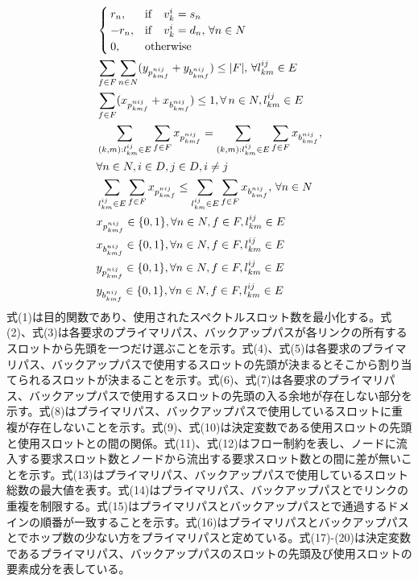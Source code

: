 \documentclass[a4j,twocolumn,fleqn]{jarticle}
\begin{document}
\begin{eqnarray}
	&\begin{cases}
	r_n,&{\rm if}\quad v^i_k = s_n\\
	-r_n,&{\rm if}\quad v^i_k = d_n,\, \forall n\in N\\ %
	0,&{\rm otherwise}
	\end{cases}\\
	&\displaystyle \sum_{f \in F}\sum_{n \in N}(y_{p^{nij}_{kmf}} + y_{b^{nij}_{kmf}}) \leq |F|,\, \forall l^{ij}_{km} \in E \\%
	&\displaystyle \sum_{f \in F}(x_{p^{nij}_{kmf}}+x_{b^{nij}_{kmf}}) \leq 1,\forall\, n \in N,l^{ij}_{km} \in E\\%
	&\displaystyle \sum_{(k,m):l^{ij}_{km} \in E}\sum_{f \in F}x_{p^{nij}_{kmf}} =\sum_{(k,m):l^{ij}_{km} \in E}\sum_{f \in F}x_{b^{nij}_{kmf}},\nonumber\\
	&\displaystyle \forall n \in N,i \in D,j \in D,i \neq j\\%
	&\displaystyle \sum_{l^{ij}_{km} \in E}\sum_{f \in F}x_{p^{nij}_{kmf}} \leq \sum_{l^{ij}_{km} \in E}\sum_{f \in F}x_{b^{nij}_{kmf}},\, \forall n\in N\\%
	&\displaystyle x_{p^{nij}_{kmf}} \in \{0,1\},\forall n \in N,f \in F,l^{ij}_{km}\in E\\
	&\displaystyle x_{b^{nij}_{kmf}} \in \{0,1\},\forall n \in N,f \in F,l^{ij}_{km}\in E\\
	&\displaystyle y_{p^{nij}_{kmf}} \in \{0,1\},\forall n \in N,f \in F,l^{ij}_{km}\in E\\
	&\displaystyle y_{b^{nij}_{kmf}} \in \{0,1\},\forall n \in N,f \in F,l^{ij}_{km}\in E
\end{eqnarray}
式(1)は目的関数であり、使用されたスペクトルスロット数を最小化する。式(2)、式(3)は各要求のプライマリパス、バックアップパスが各リンクの所有するスロットから先頭を一つだけ選ぶことを示す。式(4)、式(5)は各要求のプライマリパス、バックアップパスで使用するスロットの先頭が決まるとそこから割り当てられるスロットが決まることを示す。式(6)、式(7)は各要求のプライマリパス、バックアップパスで使用するスロットの先頭の入る余地が存在しない部分を示す。式(8)はプライマリパス、バックアップパスで使用しているスロットに重複が存在しないことを示す。式(9)、式(10)は決定変数である使用スロットの先頭と使用スロットとの間の関係。式(11)、式(12)はフロー制約を表し、ノードに流入する要求スロット数とノードから流出する要求スロット数との間に差が無いことを示す。式(13)はプライマリパス、バックアップパスで使用しているスロット総数の最大値を表す。式(14)はプライマリパス、バックアップパスとでリンクの重複を制限する。式(15)はプライマリパスとバックアップパスとで通過するドメインの順番が一致することを示す。式(16)はプライマリパスとバックアップパスとでホップ数の少ない方をプライマリパスと定めている。式(17)-(20)は決定変数であるプライマリパス、バックアップパスのスロットの先頭及び使用スロットの要素成分を表している。
\end{document}
